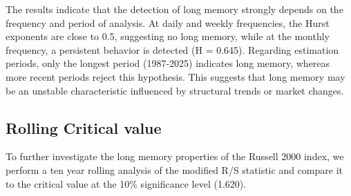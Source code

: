 \documentclass[11pt]{extarticle}
\begin{document}
\FloatBarrier

The results indicate that the detection of long memory strongly depends on the frequency and period of analysis.
At daily and weekly frequencies, the Hurst exponents are close to 0.5, suggesting no long memory, while at the monthly
frequency, a persistent behavior is detected (H = 0.645). Regarding estimation periods, only the longest period
(1987-2025) indicates long memory, whereas more recent periods reject this hypothesis. This suggests that long memory
may be an unstable characteristic influenced by structural trends or market changes.


\subsection{Rolling Critical value}

To further investigate the long memory properties of the Russell 2000 index,
we perform a ten year rolling analysis of the modified R/S statistic and compare it to the critical value at the
10\% significance level (1.620).
\end{document}
